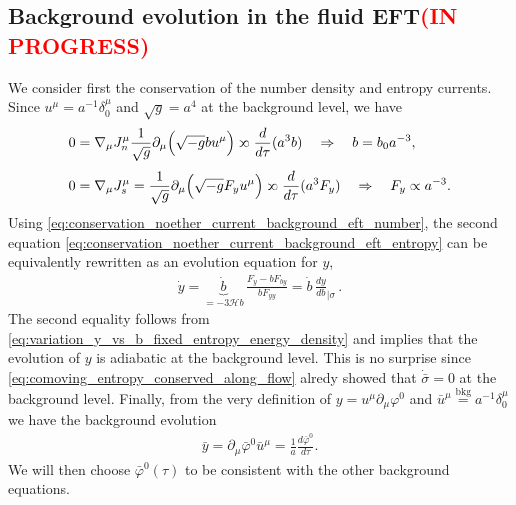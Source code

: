 \subsection{Background evolution in the fluid EFT\textcolor{red}{(IN PROGRESS)}}\label{sec:bkg_evolution_fluid_EFT}
%
We consider first the conservation of the number density and entropy currents.
Since $u^\mu=a^{-1}\delta^\mu_0$ and $\sqrt{g}=a^{4}$ at the background level, we have
\begin{subequations}\label{eq:conservation_noether_current_background_eft}
\begin{align}
    &0=\nabla_\mu J_n^\mu \frac{1}{\sqrt{g}} \partial_\mu\Big(\sqrt{-g} b u^\mu\Big) \revpropto \frac{d}{d\tau}(a^3 b)\quad \Rightarrow \quad b = b_0 a^{-3},\label{eq:conservation_noether_current_background_eft_number}\\[3pt]
    &0=\nabla_\mu J_s^\mu =\frac{1}{\sqrt{g}} \partial_\mu\Big(\sqrt{-g} F_y u^\mu\Big) \revpropto \frac{d}{d\tau}(a^3 F_y)\quad \Rightarrow \quad F_y\propto a^{-3}. \label{eq:conservation_noether_current_background_eft_entropy}
\end{align}
\end{subequations}
Using \eqref{eq:conservation_noether_current_background_eft_number}, the second equation \eqref {eq:conservation_noether_current_background_eft_entropy} can be equivalently rewritten as an evolution equation for $y$,
\begin{align}\label{eq:eolvution_y_background}
    \dot{y}=\underbrace{\dot{b}}_{=-3\mathcal{H}b}\,\frac{F_y-bF_{by}}{bF_{yy}} =\dot{b}\, \frac{dy}{db}_{|\sigma}\,.
\end{align}
The second equality follows from \eqref{eq:variation_y_vs_b_fixed_entropy_energy_density} and implies that the evolution of $y$ is adiabatic at the background level.
This is no surprise since \eqref{eq:comoving_entropy_conserved_along_flow} alredy showed that $\dot{\bar{\sigma}}=0$ at the background level.
Finally, from the very definition of $y=u^\mu\partial_\mu\varphi^0$ and $\bar{u}^\mu\overset{\text{bkg}}{=}a^{-1}\delta^\mu_0$ we have the background evolution
\begin{align}\label{eq:evolution_y_background_from_definition}
    \bar{y}=\partial_\mu\bar{\varphi}^0 \bar{u}^\mu = \tfrac{1}{a}\tfrac{d\bar{\varphi}^0}{d\tau}.
\end{align}
We will then choose $\bar{\varphi}^0(\tau)$ to be consistent with the other background equations.

